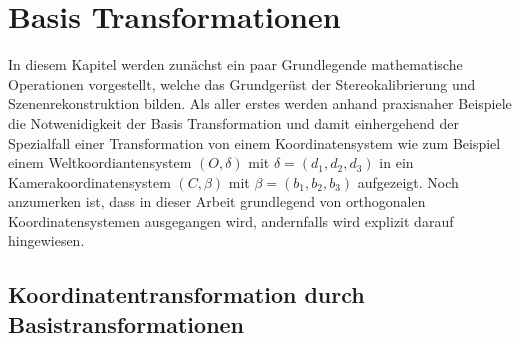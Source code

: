 \chapter{Basis Transformationen }
\label{sec:basisTransformation} 


 
In diesem Kapitel werden zunächst ein paar Grundlegende mathematische Operationen vorgestellt, welche das Grundgerüst der Stereokalibrierung und Szenenrekonstruktion bilden.
Als aller erstes werden anhand praxisnaher Beispiele die Notwenidigkeit der Basis Transformation und damit einhergehend der Spezialfall einer Transformation von einem Koordinatensystem wie zum Beispiel einem Weltkoordiantensystem $(O,\delta)$ mit $\delta=(d_1, d_2, d_3)$ in ein Kamerakoordinatensystem $(C,\beta)$ mit $\beta=(b_1,b_2,b_3)$ aufgezeigt. Noch anzumerken ist, dass in dieser Arbeit grundlegend von orthogonalen Koordinatensystemen ausgegangen wird, andernfalls wird explizit darauf hingewiesen. 



%
%

\section{Koordinatentransformation durch Basistransformationen}

